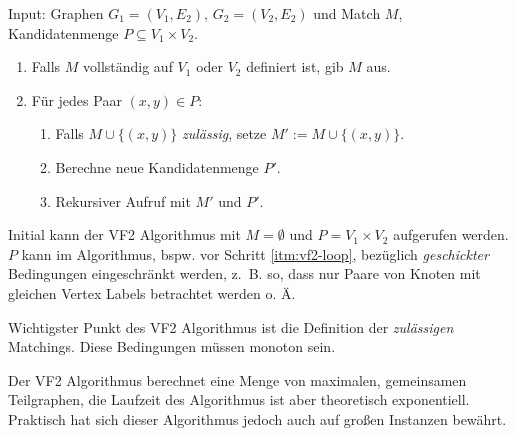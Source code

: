 \begin{definition}[VF2 Algorithmus]
    Input: Graphen $ G_1 = (V_1, E_2) $, $ G_2 = (V_2, E_2) $ und Match $ M $, Kandidatenmenge $ P \subseteq V_1 \times V_2 $.

    \begin{enumerate}
        \item Falls $ M $ vollständig auf $ V_1 $ oder $ V_2 $ definiert ist, gib $ M $ aus.
        \item \label{itm:vf2-loop}
        Für jedes Paar $ (x, y) \in P $:
        \begin{enumerate}
            \item Falls $ M \cup \{ (x, y) \} $ \textit{zulässig}, setze $ M' := M \cup \{ (x, y) \} $.
            \item Berechne neue Kandidatenmenge $ P' $.
            \item Rekursiver Aufruf mit $ M' $ und $ P' $.
        \end{enumerate}
    \end{enumerate}

    Initial kann der VF2 Algorithmus mit $ M = \emptyset $ und $ P = V_1 \times V_2 $ aufgerufen werden.
    $ P $ kann im Algorithmus, bspw. vor Schritt \ref{itm:vf2-loop}, bezüglich \textit{geschickter} Bedingungen eingeschränkt werden, z.~B. so, dass nur Paare von Knoten mit gleichen Vertex Labels betrachtet werden o. Ä.
\end{definition}

\begin{remark}
    Wichtigster Punkt des VF2 Algorithmus ist die Definition der \textit{zulässigen} Matchings.
    Diese Bedingungen müssen monoton sein.
\end{remark}

\begin{remark}
    Der VF2 Algorithmus berechnet eine Menge von maximalen, gemeinsamen Teilgraphen, die Laufzeit des Algorithmus ist aber theoretisch exponentiell.
    Praktisch hat sich dieser Algorithmus jedoch auch auf großen Instanzen bewährt.
\end{remark}
